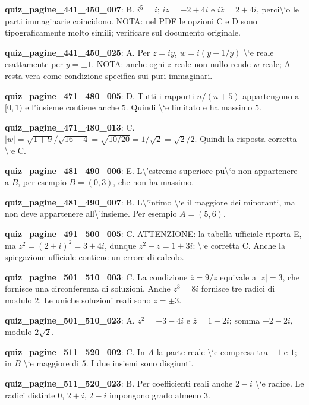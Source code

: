 \documentclass[11pt,a4paper]{article}
\newcounter{quiz}
\begin{document}
\noindent\textbf{quiz\_pagine\_441\_450\_007}: B. $i^5=i$; $iz=-2+4i$ e $i\overline z=2+4i$, perci\textbackslash{}`o le parti immaginarie coincidono. NOTA: nel PDF le opzioni C e D sono tipograficamente molto simili; verificare sul documento originale.\par\medskip
\noindent\textbf{quiz\_pagine\_441\_450\_025}: A. Per $z=iy$, $w=i(y-1/y)$ \textbackslash{}`e reale esattamente per $y=\pm1$. NOTA: anche ogni $z$ reale non nullo rende $w$ reale; A resta vera come condizione specifica sui puri immaginari.\par\medskip
\noindent\textbf{quiz\_pagine\_471\_480\_005}: D. Tutti i rapporti $n/(n+5)$ appartengono a $[0,1)$ e l'insieme contiene anche $5$. Quindi \textbackslash{}`e limitato e ha massimo $5$.\par\medskip
\noindent\textbf{quiz\_pagine\_471\_480\_013}: C. $|w|=\sqrt{1+9}/\sqrt{16+4}=\sqrt{10/20}=1/\sqrt2=\sqrt2/2$. Quindi la risposta corretta \textbackslash{}`e C.\par\medskip
\noindent\textbf{quiz\_pagine\_481\_490\_006}: E. L\textbackslash{}'estremo superiore pu\textbackslash{}`o non appartenere a $B$, per esempio $B=(0,3)$, che non ha massimo.\par\medskip
\noindent\textbf{quiz\_pagine\_481\_490\_007}: B. L\textbackslash{}'infimo \textbackslash{}`e il maggiore dei minoranti, ma non deve appartenere all\textbackslash{}'insieme. Per esempio $A=(5,6)$.\par\medskip
\noindent\textbf{quiz\_pagine\_491\_500\_005}: C. ATTENZIONE: la tabella ufficiale riporta E, ma $z^2=(2+i)^2=3+4i$, dunque $z^2-z=1+3i$: \textbackslash{}`e corretta C. Anche la spiegazione ufficiale contiene un errore di calcolo.\par\medskip
\noindent\textbf{quiz\_pagine\_501\_510\_003}: C. La condizione $\overline z=9/z$ equivale a $|z|=3$, che fornisce una circonferenza di soluzioni. Anche $z^3=8i$ fornisce tre radici di modulo $2$. Le uniche soluzioni reali sono $z=\pm3$.\par\medskip
\noindent\textbf{quiz\_pagine\_501\_510\_023}: A. $z^2=-3-4i$ e $\overline z=1+2i$; somma $-2-2i$, modulo $2\sqrt2$.\par\medskip
\noindent\textbf{quiz\_pagine\_511\_520\_002}: C. In $A$ la parte reale \textbackslash{}`e compresa tra $-1$ e $1$; in $B$ \textbackslash{}`e maggiore di $5$. I due insiemi sono disgiunti.\par\medskip
\noindent\textbf{quiz\_pagine\_511\_520\_023}: B. Per coefficienti reali anche $2-i$ \textbackslash{}`e radice. Le radici distinte $0$, $2+i$, $2-i$ impongono grado almeno $3$.\par\medskip
\end{document}
